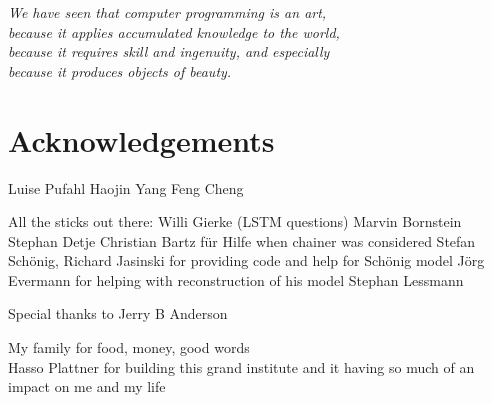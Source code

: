 
\begin{flushright}{\slshape
We have seen that computer programming is an art, \\
because it applies accumulated knowledge to the world, \\
because it requires skill and ingenuity, and especially \\
because it produces objects of beauty.} \\ \medskip
\end{flushright}

\bigskip


\begingroup

\let\clearpage\relax
\let\cleardoublepage\relax
\let\cleardoublepage\relax

\chapter*{Acknowledgements}

Luise Pufahl
Haojin Yang
Feng Cheng

All the sticks out there:
Willi Gierke (LSTM questions)
Marvin Bornstein
Stephan Detje
Christian Bartz für Hilfe when chainer was considered
Stefan Schönig, Richard Jasinski for providing code and help for Schönig\cite{schoenig2018} model
Jörg Evermann for helping with reconstruction of his model\cite{evermann2016}
Stephan Lessmann

Special thanks to Jerry B Anderson

My family for food, money, good words\\

Hasso Plattner for building this grand institute and it having so much of an impact on me and my life

\endgroup

